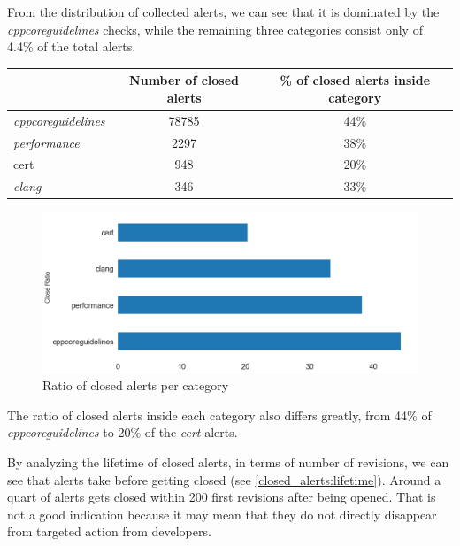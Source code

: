 From the distribution of collected alerts, we can see that it is dominated by the \textit{cppcoreguidelines} checks, while the remaining three categories consist only of 4.4\% of the total alerts.

\begin{table}[H]
	\centering
	\begin{tabular}{lcc}
		\hline
		& \textbf{Number of closed alerts} & \textbf{\% of closed alerts inside category} \\ \hline
		\textit{cppcoreguidelines} & 78785                            & 44\%                                         \\
		\textit{performance}       & 2297                             & 38\%                                         \\
		cert                       & 948                              & 20\%                                         \\
		\textit{clang}             & 346                              & 33\%                                         \\ \hline
	\end{tabular}
\end{table}

\begin{figure}[H]
	\centering
	\includegraphics[scale=0.4]{./src/data_analysis/closed_ratio_category.png}
	\caption{Ratio of closed alerts per category}
\end{figure}

The ratio of closed alerts inside each category also differs greatly, from 44\% of \textit{cppcoreguidelines} to 20\% of the \textit{cert} alerts.

By analyzing the lifetime of closed alerts, in terms of number of revisions, we can see that alerts take before getting closed (see \cref{closed_alerts:lifetime}). Around a quart of alerts gets closed within 200 first revisions after being opened. That is not a good indication because it may mean that they do not directly disappear from targeted action from developers.

